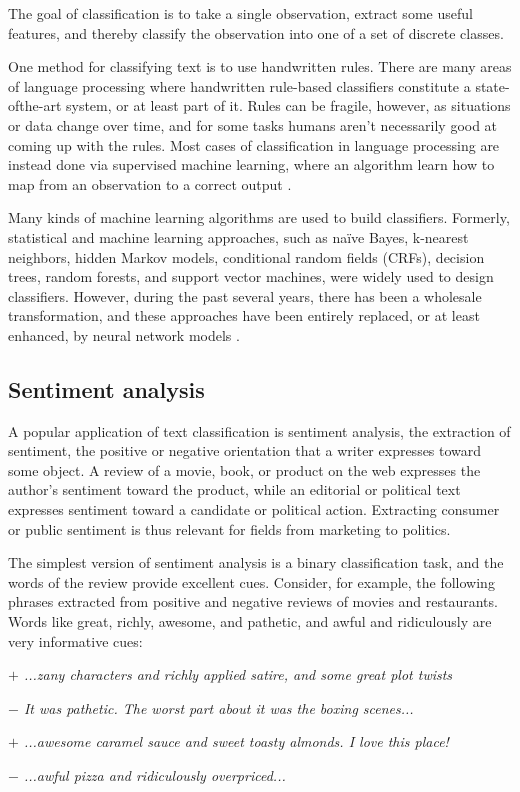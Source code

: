 The goal of classification is to take a single observation, extract some useful features, and thereby classify the observation into one of a set of discrete classes.

One method for classifying text is to use handwritten rules. There are many areas of language processing where handwritten rule-based classifiers constitute a state-ofthe-art system, or at least part of it. Rules can be fragile, however, as situations or data change over time, and for
some tasks humans aren't necessarily good at coming up with the rules. Most cases of classification in language processing are instead done via supervised machine learning, where an algorithm learn how to map from an observation to a correct output \cite{Jurafsky2009}.

Many kinds of machine learning algorithms are used to build classifiers.
Formerly, statistical and machine learning approaches, such as naïve Bayes, k-nearest neighbors, hidden Markov models, conditional random fields (CRFs), decision trees, random forests, and support vector machines, were widely used to design classifiers. 
However, during the past several years, there has been a wholesale transformation, and these approaches have been entirely replaced, or at least enhanced, by neural network models \cite{surveyNlpDeepLearning}. 

\subsection{Sentiment analysis}\label{subsec:sentiment-analysis}
A popular application of text classification is sentiment analysis, the extraction of sentiment, the positive or negative orientation that a writer expresses toward some object. A review of a movie, book, or product on the web expresses the author's sentiment toward the product, while an editorial or political text expresses sentiment toward a candidate or political action. Extracting consumer or public sentiment is thus relevant for fields from marketing to politics. \cite{Jurafsky2009}

The simplest version of sentiment analysis is a binary classification task, and
the words of the review provide excellent cues. Consider, for example, the following phrases extracted from positive and negative reviews of movies and restaurants. Words like great, richly, awesome, and pathetic, and awful and ridiculously are very informative cues:

\emph{$+$ ...zany characters and richly applied satire, and some great plot twists}
\par
\emph{$-$ It was pathetic. The worst part about it was the boxing scenes...}
\par
\emph{$+$ ...awesome caramel sauce and sweet toasty almonds. I love this place!}
\par
\emph{$-$ ...awful pizza and ridiculously overpriced...} 

